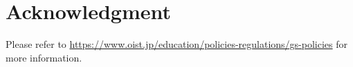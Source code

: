 \chapter*{Acknowledgment}

Please refer to \url{https://www.oist.jp/education/policies-regulations/gs-policies} for more information.
